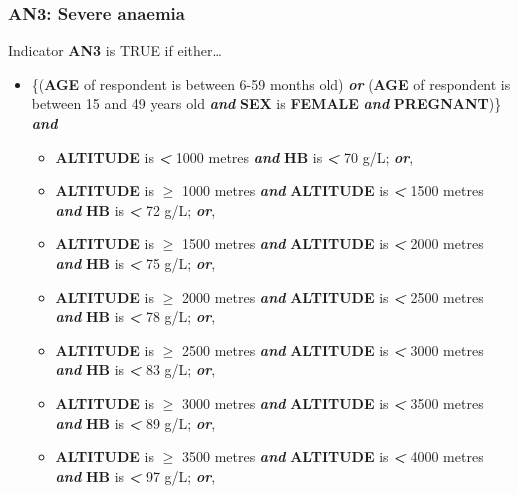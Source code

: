 \documentclass[12pt,a4paper]{article}
\begin{document}
\hypertarget{an3-severe-anaemia}{%
\subsubsection{AN3: Severe anaemia}\label{an3-severe-anaemia}}

Indicator \textbf{AN3} is TRUE if either\ldots{}

\begin{itemize}
\item
  \{(\textbf{AGE} of respondent is between 6-59 months old) \textbf{\emph{or}} (\textbf{AGE} of respondent is between 15 and 49 years old \textbf{\emph{and}} \textbf{SEX} is \textbf{FEMALE} \textbf{\emph{and}} \textbf{PREGNANT})\} \textbf{\emph{and}}

  \begin{itemize}
  \item
    \textbf{ALTITUDE} is \textbf{\emph{\textless{}}} 1000 metres \textbf{\emph{and}} \textbf{HB} is \textbf{\emph{\textless{}}} 70 g/L; \textbf{\emph{or}},
  \item
    \textbf{ALTITUDE} is \textbf{\emph{\(\geq\)}} 1000 metres \textbf{\emph{and}} \textbf{ALTITUDE} is \textbf{\emph{\textless{}}} 1500 metres \textbf{\emph{and}} \textbf{HB} is \textbf{\emph{\textless{}}} 72 g/L; \textbf{\emph{or}},
  \item
    \textbf{ALTITUDE} is \textbf{\emph{\(\geq\)}} 1500 metres \textbf{\emph{and}} \textbf{ALTITUDE} is \textbf{\emph{\textless{}}} 2000 metres \textbf{\emph{and}} \textbf{HB} is \textbf{\emph{\textless{}}} 75 g/L; \textbf{\emph{or}},
  \item
    \textbf{ALTITUDE} is \textbf{\emph{\(\geq\)}} 2000 metres \textbf{\emph{and}} \textbf{ALTITUDE} is \textbf{\emph{\textless{}}} 2500 metres \textbf{\emph{and}} \textbf{HB} is \textbf{\emph{\textless{}}} 78 g/L; \textbf{\emph{or}},
  \item
    \textbf{ALTITUDE} is \textbf{\emph{\(\geq\)}} 2500 metres \textbf{\emph{and}} \textbf{ALTITUDE} is \textbf{\emph{\textless{}}} 3000 metres \textbf{\emph{and}} \textbf{HB} is \textbf{\emph{\textless{}}} 83 g/L; \textbf{\emph{or}},
  \item
    \textbf{ALTITUDE} is \textbf{\emph{\(\geq\)}} 3000 metres \textbf{\emph{and}} \textbf{ALTITUDE} is \textbf{\emph{\textless{}}} 3500 metres \textbf{\emph{and}} \textbf{HB} is \textbf{\emph{\textless{}}} 89 g/L; \textbf{\emph{or}},
  \item
    \textbf{ALTITUDE} is \textbf{\emph{\(\geq\)}} 3500 metres \textbf{\emph{and}} \textbf{ALTITUDE} is \textbf{\emph{\textless{}}} 4000 metres \textbf{\emph{and}} \textbf{HB} is \textbf{\emph{\textless{}}} 97 g/L; \textbf{\emph{or}},

\end{itemize}
\end{itemize}
\end{document}
